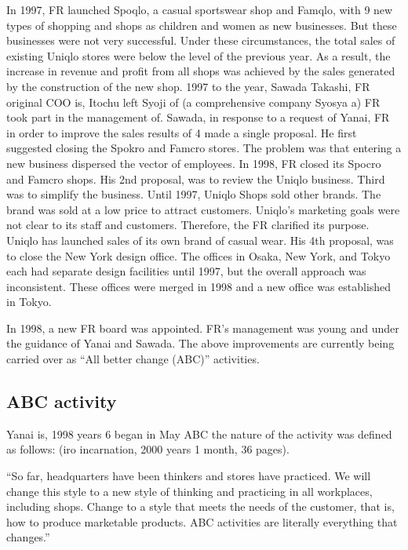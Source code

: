 \documentclass[12pt,a4paper]{article}
\begin{document}
In 1997, FR launched Spoqlo, a casual sportswear shop and Famqlo, with 9
new types of shopping and shops as children and women as new businesses.
But these businesses were not very successful. Under these
circumstances, the total sales of existing Uniqlo stores were below the
level of the previous year. As a result, the increase in revenue and
profit from all shops was achieved by the sales generated by the
construction of the new shop. 1997 to the year, Sawada Takashi, FR
original COO is, Itochu left Syoji of (a comprehensive company Syosya a)
FR took part in the management of. Sawada, in response to a request of
Yanai, FR in order to improve the sales results of 4 made a single
proposal. He first suggested closing the Spokro and Famcro stores. The
problem was that entering a new business dispersed the vector of
employees. In 1998, FR closed its Spocro and Famcro shops. His 2nd
proposal, was to review the Uniqlo business. Third was to simplify the
business. Until 1997, Uniqlo Shops sold other brands. The brand was sold
at a low price to attract customers. Uniqlo's marketing goals were not
clear to its staff and customers. Therefore, the FR clarified its
purpose. Uniqlo has launched sales of its own brand of casual wear. His
4th proposal, was to close the New York design office. The offices in
Osaka, New York, and Tokyo each had separate design facilities until
1997, but the overall approach was inconsistent. These offices were
merged in 1998 and a new office was established in Tokyo.

In 1998, a new FR board was appointed. FR's management was young and
under the guidance of Yanai and Sawada. The above improvements are
currently being carried over as ``All better change (ABC)'' activities.

\hypertarget{abc-activity}{%
\subsection{ABC activity}\label{abc-activity}}

Yanai is, 1998 years 6 began in May ABC the nature of the activity was
defined as follows: (iro incarnation, 2000 years 1 month, 36 pages).

``So far, headquarters have been thinkers and stores have practiced. We
will change this style to a new style of thinking and practicing in all
workplaces, including shops. Change to a style that meets the needs of
the customer, that is, how to produce marketable products. ABC
activities are literally everything that changes.''
\end{document}
